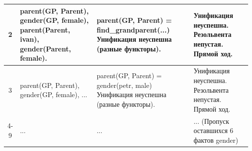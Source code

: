 \begin{tabularx}{\textwidth}{|c|>{\small}X|>{\small}X|>{\small}X|}
	2                                                                                  &
	parent(GP, Parent), \newline
	gender(GP, female), \newline
	parent(Parent, ivan), \newline
	gender(Parent, female).                                                            &
	parent(GP, Parent) = \newline
	find\_grandparent(...) \newline
	Унификация неуспешна (разные функторы).                                            &
	Унификация неуспешна. \newline
	Резольвента непустая. \newline
	Прямой ход.                                                                                  \\
	\hline

	3                                                                                  &
	parent(GP, Parent), \newline
	gender(GP, female), \newline
	...                                                                                &
	parent(GP, Parent) = \newline
	gender(petr, male) \newline
	Унификация неуспешна (разные функторы).                                            &
	Унификация неуспешна. \newline
	Резольвента непустая. \newline
	Прямой ход.                                                                                  \\
	\hline

	4-9                                                                                &
	...                                                                                &
	...                                                                                &
	... (Пропуск оставшихся 6 фактов gender)                                                     \\
	\hline


\end{tabularx}
